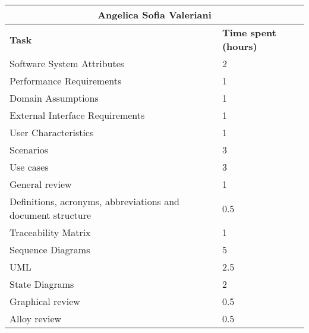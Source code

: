 \begin{table}[ht]
  \center
  \begin{tabular}{l|l}
    \multicolumn{2}{c}{\textbf{Angelica Sofia Valeriani}} \\
    \hline
    \textbf{Task} & \textbf{Time spent (hours)}\\
    \hline
    Software System Attributes & 2 \\
    Performance Requirements & 1 \\
    Domain Assumptions & 1 \\
    External Interface Requirements & 1 \\
    User Characteristics & 1 \\
    Scenarios & 3 \\
    Use cases & 3 \\
    General review & 1 \\
    Definitions, acronyms, abbreviations and document structure & 0.5 \\
    Traceability Matrix & 1 \\
    Sequence Diagrams & 5 \\
    UML & 2.5 \\
    State Diagrams & 2 \\
    Graphical review & 0.5 \\
    Alloy review & 0.5 \\
  \end{tabular}
\end{table}